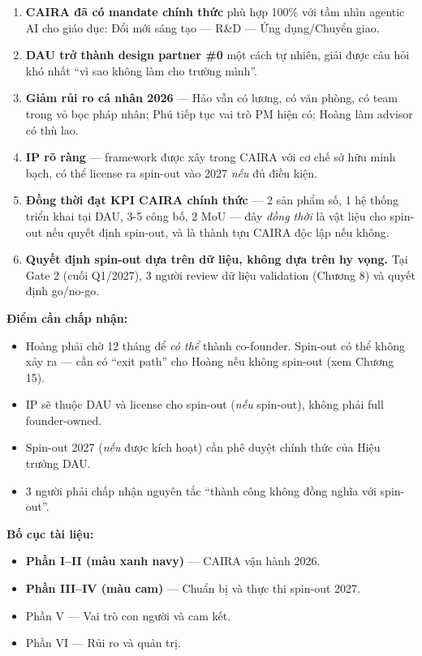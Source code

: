 \documentclass[11pt,a4paper]{article}
\begin{document}
\begin{enumerate}
\item \textbf{CAIRA đã có mandate chính thức} phù hợp 100\% với tầm nhìn agentic AI cho giáo dục: Đổi mới sáng tạo — R\&D — Ứng dụng/Chuyển giao.
\item \textbf{DAU trở thành design partner \#0} một cách tự nhiên, giải được câu hỏi khó nhất ``vì sao không làm cho trường mình''.
\item \textbf{Giảm rủi ro cá nhân 2026} — Hảo vẫn có lương, có văn phòng, có team trong vỏ bọc pháp nhân; Phú tiếp tục vai trò PM hiện có; Hoàng làm advisor có thù lao.
\item \textbf{IP rõ ràng} — framework được xây trong CAIRA với cơ chế sở hữu minh bạch, có thể license ra spin-out vào 2027 \textit{nếu} đủ điều kiện.
\item \textbf{Đồng thời đạt KPI CAIRA chính thức} — 2 sản phẩm số, 1 hệ thống triển khai tại DAU, 3-5 công bố, 2 MoU — đây \textit{đồng thời} là vật liệu cho spin-out nếu quyết định spin-out, và là thành tựu CAIRA độc lập nếu không.
\item \textbf{Quyết định spin-out dựa trên dữ liệu, không dựa trên hy vọng.} Tại Gate 2 (cuối Q1/2027), 3 người review dữ liệu validation (Chương 8) và quyết định go/no-go.
\end{enumerate}

\textbf{Điểm cần chấp nhận:}
\begin{itemize}
\item Hoàng phải chờ 12 tháng để \textit{có thể} thành co-founder. Spin-out có thể không xảy ra --- cần có ``exit path'' cho Hoàng nếu không spin-out (xem Chương 15).
\item IP sẽ thuộc DAU và license cho spin-out (\textit{nếu} spin-out), không phải full founder-owned.
\item Spin-out 2027 (\textit{nếu} được kích hoạt) cần phê duyệt chính thức của Hiệu trưởng DAU.
\item 3 người phải chấp nhận nguyên tắc ``thành công không đồng nghĩa với spin-out''.
\end{itemize}

\textbf{Bố cục tài liệu:}
\begin{itemize}
\item \textcolor{caira}{\textbf{Phần I--II (màu xanh navy)}} — CAIRA vận hành 2026.
\item \textcolor{spinout}{\textbf{Phần III--IV (màu cam)}} — Chuẩn bị và thực thi spin-out 2027.
\item Phần V — Vai trò con người và cam kết.
\item Phần VI — Rủi ro và quản trị.
\end{itemize}
\end{document}
